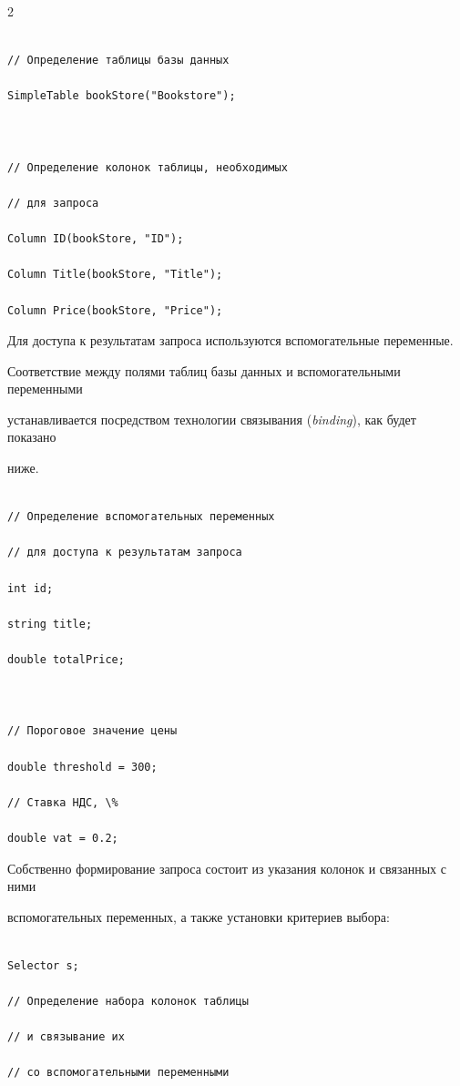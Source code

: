 \begin{multicols}{2}
\begin{verbatim}

// Определение таблицы базы данных

SimpleTable bookStore("Bookstore");



// Определение колонок таблицы, необходимых

// для запроса

Column ID(bookStore, "ID");

Column Title(bookStore, "Title");

Column Price(bookStore, "Price");

\end{verbatim}



Для доступа к результатам запроса используются вспомогательные переменные. 

Соответствие между полями таблиц базы данных и вспомогательными переменными 

устанавливается посредством технологии связывания (\textit{binding}), как будет показано 

ниже. 

\begin{verbatim}

// Определение вспомогательных переменных

// для доступа к результатам запроса

int id;

string title;

double totalPrice;



// Пороговое значение цены

double threshold = 300;

// Ставка НДС, \%

double vat = 0.2;

\end{verbatim}



Собственно формирование запроса состоит из указания колонок и связанных с ними 

вспомогательных переменных, а также установки критериев выбора: 

{\small \begin{verbatim}

Selector s;

// Определение набора колонок таблицы

// и связывание их

// со вспомогательными переменными


\end{verbatim}}
\end{multicols}
